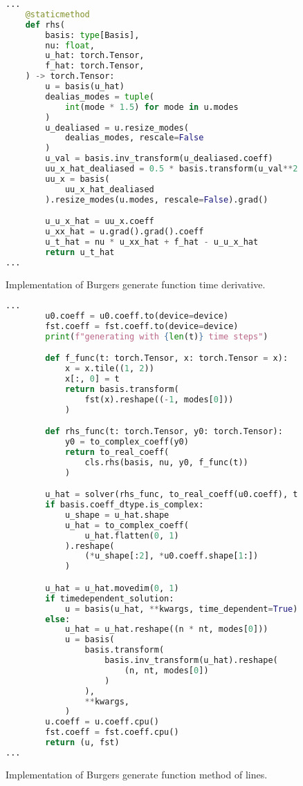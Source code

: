 \begin{figure}[H]
  \centering
  \begin{lstlisting}[language=Python]
...
    @staticmethod
    def rhs(
        basis: type[Basis],
        nu: float,
        u_hat: torch.Tensor,
        f_hat: torch.Tensor,
    ) -> torch.Tensor:
        u = basis(u_hat)
        dealias_modes = tuple(
            int(mode * 1.5) for mode in u.modes
        )
        u_dealiased = u.resize_modes(
            dealias_modes, rescale=False
        )
        u_val = basis.inv_transform(u_dealiased.coeff)
        uu_x_hat_dealiased = 0.5 * basis.transform(u_val**2)
        uu_x = basis(
            uu_x_hat_dealiased
        ).resize_modes(u.modes, rescale=False).grad()

        u_u_x_hat = uu_x.coeff
        u_xx_hat = u.grad().grad().coeff
        u_t_hat = nu * u_xx_hat + f_hat - u_u_x_hat
        return u_t_hat
...
  \end{lstlisting}
  \caption{Implementation of Burgers generate function time derivative.}\label{fig:burgers_generate_dt_impl}
\end{figure}
\begin{figure}[H]
  \centering
  \begin{lstlisting}[language=Python]
...
        u0.coeff = u0.coeff.to(device=device)
        fst.coeff = fst.coeff.to(device=device)
        print(f"generating with {len(t)} time steps")

        def f_func(t: torch.Tensor, x: torch.Tensor = x):
            x = x.tile((1, 2))
            x[:, 0] = t
            return basis.transform(
                fst(x).reshape((-1, modes[0]))
            )

        def rhs_func(t: torch.Tensor, y0: torch.Tensor):
            y0 = to_complex_coeff(y0)
            return to_real_coeff(
                cls.rhs(basis, nu, y0, f_func(t))
            )

        u_hat = solver(rhs_func, to_real_coeff(u0.coeff), t)
        if basis.coeff_dtype.is_complex:
            u_shape = u_hat.shape
            u_hat = to_complex_coeff(
                u_hat.flatten(0, 1)
            ).reshape(
                (*u_shape[:2], *u0.coeff.shape[1:])
            )

        u_hat = u_hat.movedim(0, 1)
        if timedependent_solution:
            u = basis(u_hat, **kwargs, time_dependent=True)
        else:
            u_hat = u_hat.reshape((n * nt, modes[0]))
            u = basis(
                basis.transform(
                    basis.inv_transform(u_hat).reshape(
                        (n, nt, modes[0])
                    )
                ),
                **kwargs,
            )
        u.coeff = u.coeff.cpu()
        fst.coeff = fst.coeff.cpu()
        return (u, fst)
...
  \end{lstlisting}
  \caption{Implementation of Burgers generate function method of lines.}\label{fig:burgers_generate_mol_impl}
\end{figure}

